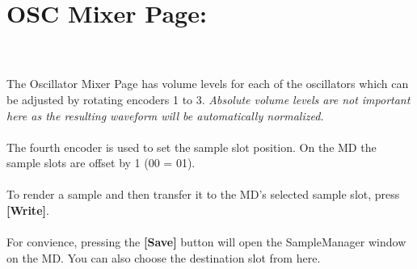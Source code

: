 \section{OSC Mixer Page:}
\\\\
The Oscillator Mixer Page has volume levels for each of the oscillators which can be adjusted by rotating encoders 1 to 3. \textit{Absolute volume levels are not important here as the resulting waveform will be automatically normalized.}\\
\\The fourth encoder is used to set the sample slot position. On the MD the sample slots are offset by 1 (00 = 01).\\
\\
To render a sample and then transfer it to the MD's selected sample slot, press \textbf{[Write]}.\\
\\
For convience, pressing the \textbf{[Save]} button will open the SampleManager window on the MD. You can also choose the destination slot from here.

